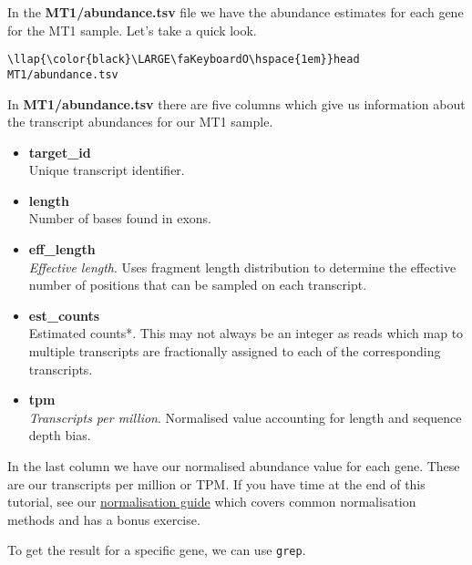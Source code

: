 \documentclass[11pt]{article}
\begin{document}
In the \textbf{MT1/abundance.tsv} file we have the abundance estimates
for each gene for the MT1 sample. Let's take a quick look.





\begin{terminalinput}
\begin{Verbatim}[commandchars=\\\{\}]
\llap{\color{black}\LARGE\faKeyboardO\hspace{1em}}head MT1/abundance.tsv
\end{Verbatim}
\end{terminalinput}



    In \textbf{MT1/abundance.tsv} there are five columns which give us
information about the transcript abundances for our MT1 sample.

\begin{itemize}
\item
  \textbf{target\_id}\\
  Unique transcript identifier.
\item
  \textbf{length}\\
  Number of bases found in exons.
\item
  \textbf{eff\_length}\\
  \textit{Effective length}. Uses fragment length distribution to
  determine the effective number of positions that can be sampled on
  each transcript.
\item
  \textbf{est\_counts}\\
  Estimated counts*. This may not always be an integer as reads which
  map to multiple transcripts are fractionally assigned to each of the
  corresponding transcripts.
\item
  \textbf{tpm}\\
  \textit{Transcripts per million}. Normalised value accounting for length
  and sequence depth bias.
\end{itemize}

In the last column we have our normalised abundance value for each gene.
These are our transcripts per million or TPM. If you have time at the
end of this tutorial, see our \href{normalisation.ipynb}{normalisation
guide} which covers common normalisation methods and has a bonus
exercise.

To get the result for a specific gene, we can use \texttt{grep}.
\end{document}
